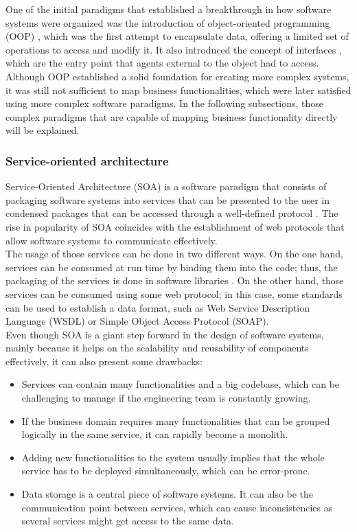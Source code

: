 \documentclass[english, 12pt, a4paper, sci, utf8, a-1b, online]{aaltothesis}
\begin{document}
One of the initial paradigms that established a breakthrough in how software systems were organized was the introduction of object-oriented programming (OOP) \cite{dahl1972chapter}, which was the first attempt to encapsulate data, offering a limited set of operations to access and modify it. It also introduced the concept of interfaces \cite{snyder1993essence}, which are the entry point that agents external to the object had to access. Although OOP established a solid foundation for creating more complex systems, it was still not sufficient to map business functionalities, which were later satisfied using more complex software paradigms. In the following subsections, those complex paradigms that are capable of mapping business functionality directly will be explained.

\subsubsection{Service-oriented architecture}

Service-Oriented Architecture (SOA) is a software paradigm that consists of packaging software systems into services that can be presented to the user in condensed packages that can be accessed through a well-defined protocol \cite{sprott2004understanding}. The rise in popularity of SOA coincides with the establishment of web protocols that allow software systems to communicate effectively.\\

The usage of those services can be done in two different ways. On the one hand, services can be consumed at run time by binding them into the code; thus, the packaging of the services is done in software libraries \cite{alahmari2010service}. On the other hand, those services can be consumed using some web protocol; in this case, some standards can be used to establish a data format, such as Web Service Description Language (WSDL) or Simple Object Access Protocol (SOAP).\\

Even though SOA is a giant step forward in the design of software systems, mainly because it helps on the scalability and reusability of components effectively, it can also present some drawbacks:

\begin{itemize}
    \item Services can contain many functionalities and a big codebase, which can be challenging to manage if the engineering team is constantly growing.
    \item If the business domain requires many functionalities that can be grouped logically in the same service, it can rapidly become a monolith. 
    \item Adding new functionalities to the system usually implies that the whole service has to be deployed simultaneously, which can be error-prone.
    \item Data storage is a central piece of software systems. It can also be the communication point between services, which can cause inconsistencies as several services might get access to the same data.
\end{itemize}
\end{document}
